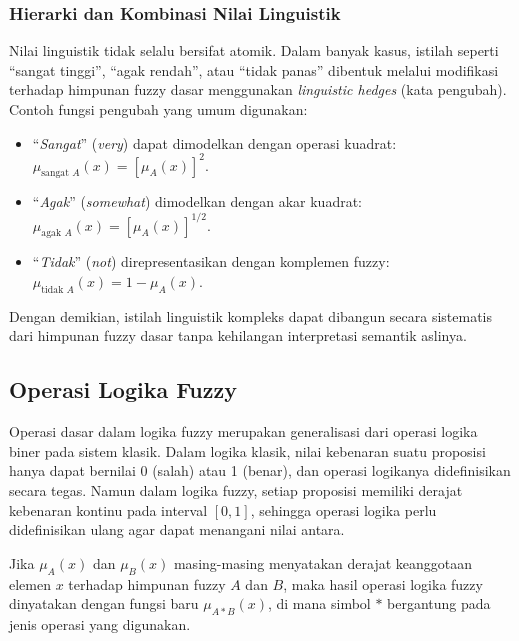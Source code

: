 \documentclass[12pt,a4paper]{article}
\theoremstyle{remark}
\begin{document}
\subsubsection{Hierarki dan Kombinasi Nilai Linguistik}
Nilai linguistik tidak selalu bersifat atomik. Dalam banyak kasus, istilah seperti “sangat tinggi”, “agak rendah”, atau “tidak panas” dibentuk melalui modifikasi terhadap himpunan fuzzy dasar menggunakan \textit{linguistic hedges} (kata pengubah).
Contoh fungsi pengubah yang umum digunakan:
\begin{itemize}
    \item “\textit{Sangat}” (\textit{very}) dapat dimodelkan dengan operasi kuadrat: \(\mu_{\text{sangat }A}(x) = [\mu_A(x)]^2\).
    \item “\textit{Agak}” (\textit{somewhat}) dimodelkan dengan akar kuadrat: \(\mu_{\text{agak }A}(x) = [\mu_A(x)]^{1/2}\).
    \item “\textit{Tidak}” (\textit{not}) direpresentasikan dengan komplemen fuzzy: \(\mu_{\text{tidak }A}(x) = 1 - \mu_A(x)\).
\end{itemize}

Dengan demikian, istilah linguistik kompleks dapat dibangun secara sistematis dari himpunan fuzzy dasar tanpa kehilangan interpretasi semantik aslinya.

\subsection{Operasi Logika Fuzzy}

Operasi dasar dalam logika fuzzy merupakan generalisasi dari operasi logika biner pada sistem klasik. Dalam logika klasik, nilai kebenaran suatu proposisi hanya dapat bernilai 0 (salah) atau 1 (benar), dan operasi logikanya didefinisikan secara tegas. Namun dalam logika fuzzy, setiap proposisi memiliki derajat kebenaran kontinu pada interval \([0,1]\), sehingga operasi logika perlu didefinisikan ulang agar dapat menangani nilai antara.

Jika \(\mu_A(x)\) dan \(\mu_B(x)\) masing-masing menyatakan derajat keanggotaan elemen \(x\) terhadap himpunan fuzzy \(A\) dan \(B\), maka hasil operasi logika fuzzy dinyatakan dengan fungsi baru \(\mu_{A * B}(x)\), di mana simbol \(*\) bergantung pada jenis operasi yang digunakan.
\end{document}
